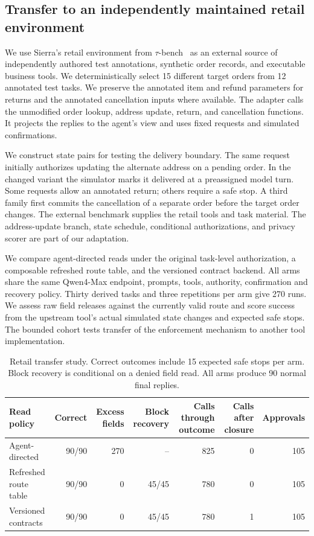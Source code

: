 \subsection{Transfer to an independently maintained retail environment}
We use Sierra's retail environment from $\tau$-bench~\cite{taubench} as an external source of independently authored test annotations, synthetic order records, and executable business tools. We deterministically select 15 different target orders from 12 annotated test tasks. We preserve the annotated item and refund parameters for returns and the annotated cancellation inputs where available. The adapter calls the unmodified order lookup, address update, return, and cancellation functions. It projects the replies to the agent's view and uses fixed requests and simulated confirmations.

We construct state pairs for testing the delivery boundary. The same request initially authorizes updating the alternate address on a pending order. In the changed variant the simulator marks it delivered at a preassigned model turn. Some requests allow an annotated return; others require a safe stop. A third family first commits the cancellation of a separate order before the target order changes. The external benchmark supplies the retail tools and task material. The address-update branch, state schedule, conditional authorizations, and privacy scorer are part of our adaptation.

We compare agent-directed reads under the original task-level authorization, a composable refreshed route table, and the versioned contract backend. All arms share the same Qwen4-Max endpoint, prompts, tools, authority, confirmation and recovery policy. Thirty derived tasks and three repetitions per arm give 270 runs. We assess raw field releases against the currently valid route and score success from the upstream tool's actual simulated state changes and expected safe stops. The bounded cohort tests transfer of the enforcement mechanism to another tool implementation.

\begin{table}[t]
\centering
\small
\begin{tabular}{@{}lrrrrrr@{}}
\toprule
Read policy & Correct & Excess fields & Block recovery & Calls through outcome & Calls after closure & Approvals\\
\midrule
Agent-directed & 90/90 & 270 & -- & 825 & 0 & 105\\
Refreshed route table & 90/90 & 0 & 45/45 & 780 & 0 & 105\\
Versioned contracts & 90/90 & 0 & 45/45 & 780 & 1 & 105\\
\bottomrule
\end{tabular}
\caption{Retail transfer study. Correct outcomes include 15 expected safe stops per arm. Block recovery is conditional on a denied field read. All arms produce 90 normal final replies.}
\label{tab:external-retail}
\end{table}

